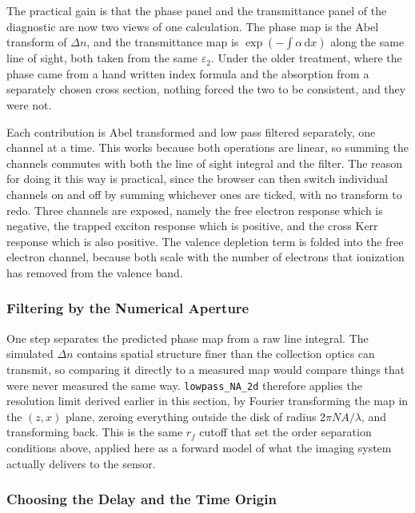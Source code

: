 The practical gain is that the phase panel and the transmittance panel of the diagnostic are now two views of one calculation. The phase map is the Abel transform of $\Delta n$, and the transmittance map is $\exp(-\int\alpha\,\mathrm{d}x)$ along the same line of sight, both taken from the same $\varepsilon_2$. Under the older treatment, where the phase came from a hand written index formula and the absorption from a separately chosen cross section, nothing forced the two to be consistent, and they were not.

Each contribution is Abel transformed and low pass filtered separately, one channel at a time. This works because both operations are linear, so summing the channels commutes with both the line of sight integral and the filter. The reason for doing it this way is practical, since the browser can then switch individual channels on and off by summing whichever ones are ticked, with no transform to redo. Three channels are exposed, namely the free electron response which is negative, the trapped exciton response which is positive, and the cross Kerr response which is also positive. The valence depletion term is folded into the free electron channel, because both scale with the number of electrons that ionization has removed from the valence band.

\subsubsection{Filtering by the Numerical Aperture}

One step separates the predicted phase map from a raw line integral. The simulated $\Delta n$ contains spatial structure finer than the collection optics can transmit, so comparing it directly to a measured map would compare things that were never measured the same way. \texttt{lowpass\_NA\_2d} therefore applies the resolution limit derived earlier in this section, by Fourier transforming the map in the $(z,x)$ plane, zeroing everything outside the disk of radius $2\pi NA/\lambda$, and transforming back. This is the same $r_f$ cutoff that set the order separation conditions above, applied here as a forward model of what the imaging system actually delivers to the sensor.

\subsubsection{Choosing the Delay and the Time Origin}

